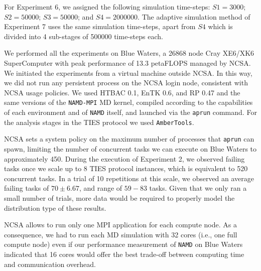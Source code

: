 For Experiment 6, we assigned the following simulation time-steps: $S1=3000$;
$S2=50000$; $S3=50000$; and $S4=2000000$. The adaptive simulation method of
Experiment 7 uses the same simulation time-steps, apart from $S4$ which is
divided into 4 sub-stages of 500000 time-steps each. 

We performed all the experiments on Blue Waters, a 26868 node Cray XE6/XK6
SuperComputer with peak performance of 13.3 petaFLOPS managed by NCSA. We
initiated the experiments from a virtual machine outside NCSA. In this way,
we did not run any persistent process on the NCSA login node, consistent with
NCSA usage policies. We used HTBAC 0.1, EnTK 0.6, and RP 0.47 and the same
versions of the \texttt{NAMD-MPI} MD kernel, compiled according to the
capabilities of each environment and of \texttt{NAMD} itself, and launched
via the \texttt{aprun} command. For the analysis stages in the TIES protocol
we used \texttt{AmberTools}.

NCSA sets a system policy on the maximum number of processes that
\texttt{aprun} can spawn, limiting the number of concurrent tasks we can
execute on Blue Waters to approximately 450. During the execution of
Experiment 2, we observed failing tasks once we scale up to 8 TIES protocol
instances, which is equivalent to 520 concurrent tasks. In a trial of 10
repetitions at this scale, we observed an average failing tasks of $70
\pm6.67$, and range of $59-83$ tasks. Given that we only ran a small number
of trials, more data would be required to properly model the distribution
type of these results.

NCSA allows to run only one MPI application for each compute node. As a
consequence, we had to run each MD simulation with 32 cores (i.e., one full
compute node) even if our performance measurement of \texttt{NAMD} on Blue
Waters indicated that 16 cores would offer the best trade-off between
computing time and communication overhead.






